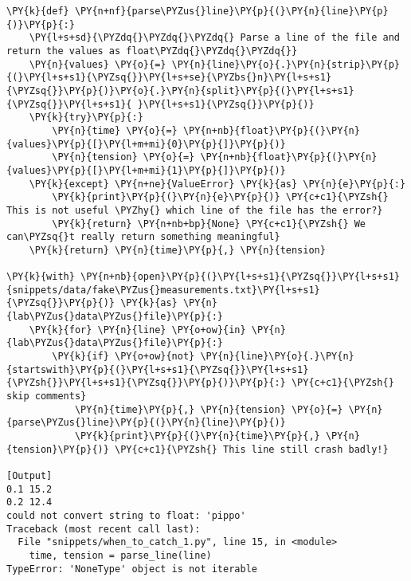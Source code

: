 \begin{Verbatim}[label=\makebox{\url{https://github.com/lucabaldini/cmepda/tree/master/slides/latex/snippets/when\_to\_catch\_1.py}},commandchars=\\\{\}]
\PY{k}{def} \PY{n+nf}{parse\PYZus{}line}\PY{p}{(}\PY{n}{line}\PY{p}{)}\PY{p}{:}
    \PY{l+s+sd}{\PYZdq{}\PYZdq{}\PYZdq{} Parse a line of the file and return the values as float\PYZdq{}\PYZdq{}\PYZdq{}}
    \PY{n}{values} \PY{o}{=} \PY{n}{line}\PY{o}{.}\PY{n}{strip}\PY{p}{(}\PY{l+s+s1}{\PYZsq{}}\PY{l+s+se}{\PYZbs{}n}\PY{l+s+s1}{\PYZsq{}}\PY{p}{)}\PY{o}{.}\PY{n}{split}\PY{p}{(}\PY{l+s+s1}{\PYZsq{}}\PY{l+s+s1}{ }\PY{l+s+s1}{\PYZsq{}}\PY{p}{)}
    \PY{k}{try}\PY{p}{:}
        \PY{n}{time} \PY{o}{=} \PY{n+nb}{float}\PY{p}{(}\PY{n}{values}\PY{p}{[}\PY{l+m+mi}{0}\PY{p}{]}\PY{p}{)}
        \PY{n}{tension} \PY{o}{=} \PY{n+nb}{float}\PY{p}{(}\PY{n}{values}\PY{p}{[}\PY{l+m+mi}{1}\PY{p}{]}\PY{p}{)}
    \PY{k}{except} \PY{n+ne}{ValueError} \PY{k}{as} \PY{n}{e}\PY{p}{:}
        \PY{k}{print}\PY{p}{(}\PY{n}{e}\PY{p}{)} \PY{c+c1}{\PYZsh{} This is not useful \PYZhy{} which line of the file has the error?}
        \PY{k}{return} \PY{n+nb+bp}{None} \PY{c+c1}{\PYZsh{} We can\PYZsq{}t really return something meaningful}
    \PY{k}{return} \PY{n}{time}\PY{p}{,} \PY{n}{tension}

\PY{k}{with} \PY{n+nb}{open}\PY{p}{(}\PY{l+s+s1}{\PYZsq{}}\PY{l+s+s1}{snippets/data/fake\PYZus{}measurements.txt}\PY{l+s+s1}{\PYZsq{}}\PY{p}{)} \PY{k}{as} \PY{n}{lab\PYZus{}data\PYZus{}file}\PY{p}{:}
    \PY{k}{for} \PY{n}{line} \PY{o+ow}{in} \PY{n}{lab\PYZus{}data\PYZus{}file}\PY{p}{:}
        \PY{k}{if} \PY{o+ow}{not} \PY{n}{line}\PY{o}{.}\PY{n}{startswith}\PY{p}{(}\PY{l+s+s1}{\PYZsq{}}\PY{l+s+s1}{\PYZsh{}}\PY{l+s+s1}{\PYZsq{}}\PY{p}{)}\PY{p}{:} \PY{c+c1}{\PYZsh{} skip comments}
            \PY{n}{time}\PY{p}{,} \PY{n}{tension} \PY{o}{=} \PY{n}{parse\PYZus{}line}\PY{p}{(}\PY{n}{line}\PY{p}{)}
            \PY{k}{print}\PY{p}{(}\PY{n}{time}\PY{p}{,} \PY{n}{tension}\PY{p}{)} \PY{c+c1}{\PYZsh{} This line still crash badly!}

[Output]
0.1 15.2
0.2 12.4
could not convert string to float: 'pippo'
Traceback (most recent call last):
  File "snippets/when_to_catch_1.py", line 15, in <module>
    time, tension = parse_line(line)
TypeError: 'NoneType' object is not iterable
\end{Verbatim}